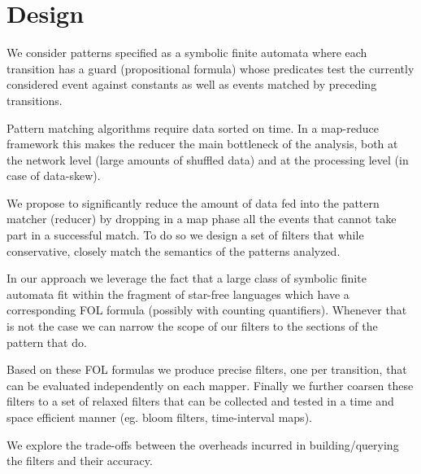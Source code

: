 \section{Design}

We consider patterns specified as a symbolic finite automata where each
transition has a guard (propositional formula) whose predicates test the
currently considered event against constants as well as events matched by
preceding transitions.
   
Pattern matching algorithms require data sorted on time.
In a map-reduce framework this makes the reducer the main bottleneck of the
analysis, both at the network level (large amounts of shuffled data) and at
the processing level (in case of data-skew).



We propose to significantly reduce the amount of data fed into the pattern
matcher (reducer) by dropping in a map phase all the events that cannot take
part in a successful match.
To do so we design a set of filters that while conservative, closely match the
semantics of the patterns analyzed.

\begin{comment}
We propose three levels of abstraction.
The first enforces the join constraints between different transitions as
expressed by join predicates within the transition guards.
The second one further imposes time windowing constraints (all events of a
successful match must occur within a timeout of the first event in the match).
Finally the last one enforces ordering constraints between {\em consecutive}
transitions of the pattern.
\end{comment}

In our approach we leverage the fact that a large class of symbolic finite
automata fit within the fragment of star-free languages which
have a corresponding FOL formula (possibly with counting quantifiers).
Whenever that is not the case we can narrow the scope of our filters to the
sections of the pattern that do.
 
Based on these FOL formulas we produce precise filters, one per transition, 
that can be evaluated independently on each mapper.
Finally we further coarsen these filters to a set of relaxed filters
that can be collected and tested in a time and space efficient manner (eg. bloom
filters, time-interval maps).

We explore the trade-offs between the overheads incurred in building/querying
the filters and their accuracy. 



